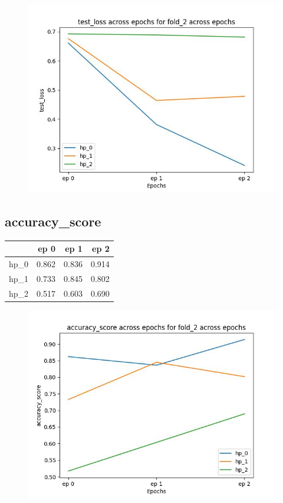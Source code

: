 \documentclass{article}
\begin{document}
\begin{figure}[H]
\includegraphics[scale = 0.75]{fold_2/test_loss}
\end{figure}
\subsection{accuracy\_score}
\begin{tabular}{lrrr}
\toprule
{} &   ep 0 &   ep 1 &   ep 2 \\
\midrule
hp\_0 &  0.862 &  0.836 &  0.914 \\
hp\_1 &  0.733 &  0.845 &  0.802 \\
hp\_2 &  0.517 &  0.603 &  0.690 \\
\bottomrule
\end{tabular}

\begin{figure}[H]
\includegraphics[scale = 0.75]{fold_2/accuracy_score}
\end{figure}
\end{document}
